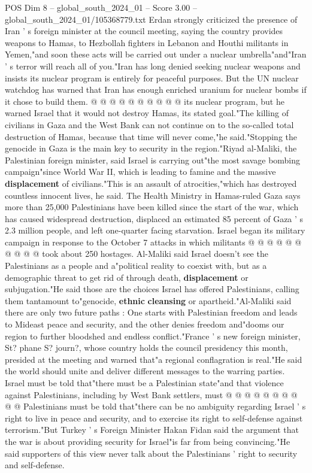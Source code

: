 \begin{textsample}{POS Dim 8 – global\_south\_2024\_01 – Score 3.00 – global\_south\_2024\_01/105368779.txt}
Erdan strongly criticized the presence of Iran ' s foreign minister at the council meeting, saying the country provides weapons to Hamas, to Hezbollah fighters in Lebanon and Houthi militants in Yemen,"and soon these acts will be carried out under a nuclear umbrella"and"Iran ' s terror will reach all of you."Iran has long denied seeking nuclear weapons and insists its nuclear program is entirely for peaceful purposes.
But the UN nuclear watchdog has warned that Iran has enough enriched uranium for nuclear bombs if it chose to build them. @ @ @ @ @ @ @ @ @ @ its nuclear program, but he warned Israel that it would not destroy Hamas, its stated goal."The killing of civilians in Gaza and the West Bank can not continue on to the so-called total destruction of Hamas, because that time will never come,"he said."Stopping the genocide in Gaza is the main key to security in the region."Riyad al-Maliki, the Palestinian foreign minister, said Israel is carrying out"the most savage bombing campaign"since World War II, which is leading to famine and the massive \textbf{displacement} of civilians."This is an assault of atrocities,"which has destroyed countless innocent lives, he said.
The Health Ministry in Hamas-ruled Gaza says more than 25,000 Palestinians have been killed since the start of the war, which has caused widespread destruction, displaced an estimated 85 percent of Gaza ' s 2.3 million people, and left one-quarter facing starvation.
Israel began its military campaign in response to the October 7 attacks in which militants @ @ @ @ @ @ @ @ @ @ took about 250 hostages.
Al-Maliki said Israel doesn't see the Palestinians as a people and a"political reality to coexist with, but as a demographic threat to get rid of through death, \textbf{displacement} or subjugation."He said those are the choices Israel has offered Palestinians, calling them tantamount to"genocide, \textbf{ethnic} \textbf{cleansing} or apartheid."Al-Maliki said there are only two future paths : One starts with Palestinian freedom and leads to Mideast peace and security, and the other denies freedom and"dooms our region to further bloodshed and endless conflict."France ' s new foreign minister, St? phane S? journ?, whose country holds the council presidency this month, presided at the meeting and warned that"a regional conflagration is real."He said the world should unite and deliver different messages to the warring parties.
Israel must be told that"there must be a Palestinian state"and that violence against Palestinians, including by West Bank settlers, must @ @ @ @ @ @ @ @ @ @ Palestinians must be told that"there can be no ambiguity regarding Israel ' s right to live in peace and security, and to exercise its right to self-defense against terrorism."But Turkey ' s Foreign Minister Hakan Fidan said the argument that the war is about providing security for Israel"is far from being convincing."He said supporters of this view never talk about the Palestinians ' right to security and self-defense.

\end{textsample}
